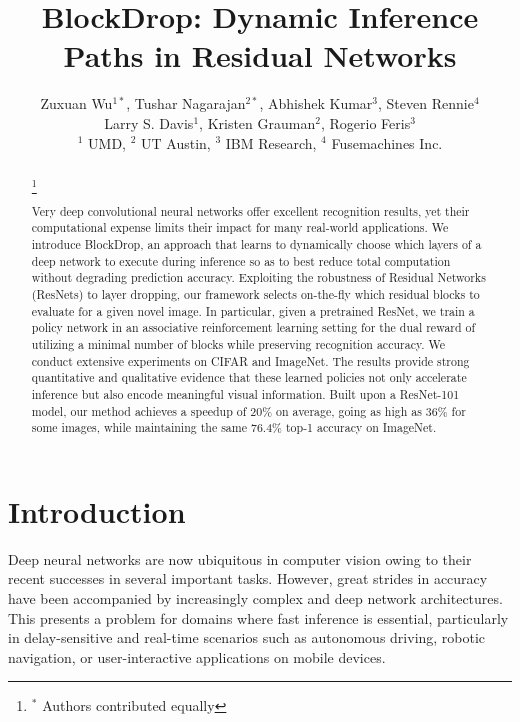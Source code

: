 \documentclass[10pt,twocolumn,letterpaper]{article}
\begin{document}
\title{BlockDrop: Dynamic Inference Paths in Residual Networks}
\newcommand\blfootnote[1]{%
  \begingroup
  \renewcommand\thefootnote{}\footnote{#1}%
  \addtocounter{footnote}{-1}%
  \endgroup
}


\author{Zuxuan Wu$^{1*}$, Tushar Nagarajan$^{2*}$, Abhishek Kumar$^{3}$, Steven Rennie$^{4}$ \\ Larry S. Davis$^{1}$, Kristen Grauman$^{2}$, Rogerio Feris$^{3}$ \\
$^{1}$ UMD, $^{2}$ UT Austin, $^{3}$ IBM Research, $^{4}$ Fusemachines Inc.}

\maketitle

\begin{abstract}
\blfootnote{$^{*}$ Authors contributed equally}
Very deep convolutional neural networks offer excellent recognition results, yet their computational expense limits their impact for many real-world applications.  We introduce BlockDrop, an approach that learns to dynamically choose which layers of a deep network to execute during inference so as to best reduce total computation without degrading prediction accuracy.   Exploiting the robustness of Residual Networks (ResNets) to layer dropping, our framework selects on-the-fly which residual blocks to evaluate for a given novel image.
In particular, given a pretrained ResNet, we train a policy network in an associative reinforcement learning setting for the dual reward of utilizing a minimal number of blocks while preserving recognition accuracy. We conduct extensive experiments on CIFAR and ImageNet.  The results provide strong quantitative and qualitative evidence that these learned policies not only accelerate inference but also encode meaningful visual information. Built upon a ResNet-101 model, our method achieves a speedup of 20\% on average, going as high as 36\% for some images, while maintaining the same 76.4\% top-1 accuracy on ImageNet.
\end{abstract}
\thispagestyle{empty}

\section{Introduction}\label{sec:intro}

Deep neural networks are now ubiquitous in computer vision owing to their recent successes in several important tasks.   However, great strides in accuracy have been accompanied by increasingly complex and deep network architectures.  This presents a problem for domains where fast inference is essential, particularly in delay-sensitive and real-time scenarios such as autonomous driving, robotic navigation, or user-interactive applications on mobile devices. 
\end{document}
